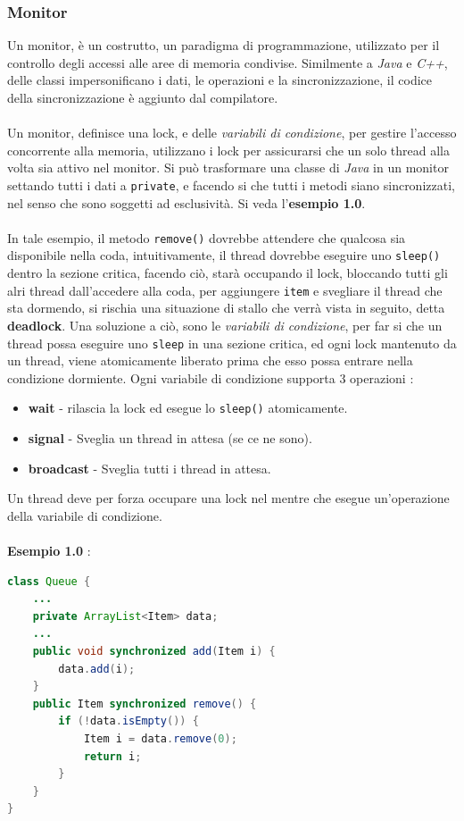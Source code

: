 \documentclass[12pt, letterpaper]{article}
\newcommand{\code}[1]{\colorbox{light-gray}{\texttt{#1}}}
\newcommand{\acc}{\\\hphantom{}\\}
\begin{document}
\subsubsection{Monitor}
Un monitor, è un costrutto, un paradigma di programmazione, utilizzato per il controllo degli accessi alle aree di 
memoria condivise. Similmente a \textit{Java} e \textit{C++}, delle classi impersonificano i dati, le operazioni e la 
sincronizzazione, il codice della sincronizzazione è aggiunto dal compilatore. \acc 
Un monitor, definisce una lock, e delle \textit{variabili di condizione}, per gestire l'accesso concorrente alla memoria, 
utilizzano i lock per assicurarsi che un solo thread alla volta sia attivo nel monitor. Si può trasformare una classe 
di \textit{Java} in un monitor settando tutti i dati a \code{private}, e facendo si che tutti i 
metodi siano sincronizzati, nel senso che sono soggetti ad esclusività.
Si veda l'\textbf{esempio 1.0}.\acc 
In tale esempio, il metodo \code{remove()} dovrebbe attendere che qualcosa sia disponibile nella coda, 
intuitivamente, il thread dovrebbe eseguire uno \code{sleep()} dentro la sezione critica, facendo ciò, 
starà occupando il lock, bloccando tutti gli alri thread dall'accedere alla coda, per aggiungere \code{item} e svegliare 
il thread che sta dormendo, si rischia una situazione di stallo che verrà vista in seguito, detta \textbf{deadlock}.
 Una soluzione a ciò, sono le \textit{variabili di condizione}, per far si che un thread possa 
 eseguire uno \code{sleep} in una sezione critica, ed ogni lock mantenuto da un thread, viene atomicamente liberato prima 
 che esso possa entrare nella condizione dormiente. Ogni variabile di condizione supporta 3 operazioni :\begin{itemize}
    \item \textbf{wait} - rilascia la lock ed esegue lo \code{sleep()} atomicamente. 
    \item \textbf{signal} - Sveglia un thread in attesa (se ce ne sono). 
    \item \textbf{broadcast} - Sveglia tutti i thread in attesa.
 \end{itemize}
 Un thread deve per forza occupare una lock nel mentre che esegue un'operazione della variabile di condizione. 
\acc \textbf{Esempio 1.0} :
\begin{lstlisting}[language=Java]
class Queue {
    ...
    private ArrayList<Item> data;
    ...
    public void synchronized add(Item i) {
        data.add(i);
    }
    public Item synchronized remove() {
        if (!data.isEmpty()) {
            Item i = data.remove(0);
            return i;
        }
    }
}
    
\end{lstlisting}
\end{document}
